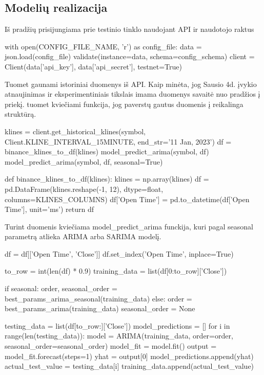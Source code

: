 \documentclass{VUMIFInfKursinis}
\begin{document}
\subsection{Modelių realizacija}

Iš pradžių prisijungiama prie testinio tinklo naudojant API ir naudotojo raktus

\begin{python}
  with open(CONFIG_FILE_NAME, 'r') as config_file:
  	data = json.load(config_file)
  	validate(instance=data, schema=config_schema)
  	client = Client(data['api_key'], data['api_secret'], testnet=True)
\end{python}

Tuomet gaunami istoriniai duomenys iš API. Kaip minėta, jog Sausio 4d. įvykio atnaujinimas ir eksperimentiniais tikslais imama duomenys savaitė nuo pradžios į priekį.
tuomet kviečiami funkcija, jog paverstų gautus duomenis į reikalinga struktūrą.

\begin{python}
  klines = client.get_historical_klines(symbol, Client.KLINE_INTERVAL_15MINUTE, end_str='11 Jan, 2023')
  df = binance_klines_to_df(klines)
  model_predict_arima(symbol, df)
  model_predict_arima(symbol, df, seasonal=True)

  def binance_klines_to_df(klines):
  	klines = np.array(klines)
  	df = pd.DataFrame(klines.reshape(-1, 12), dtype=float, columns=KLINES_COLUMNS)
  	df['Open Time'] = pd.to_datetime(df['Open Time'], unit='ms')
  	return df
\end{python}

Turint duomenis kviečiama model\_predict\_arima funckija, kuri pagal seasonal parametrą atlieka ARIMA arba SARIMA modelį.

\begin{python}
  df = df[['Open Time', 'Close']]
  df.set_index('Open Time', inplace=True)
  
  to_row = int(len(df) * 0.9)
  training_data = list(df[0:to_row]['Close'])
  
  if seasonal:
  	order, seasonal_order = best_params_arima_seasonal(training_data)
  else:
  	order = best_params_arima(training_data)
  	seasonal_order = None
  
  testing_data = list(df[to_row:]['Close'])
  model_predictions = []
  for i in range(len(testing_data)):
  	model = ARIMA(training_data, order=order, seasonal_order=seasonal_order)
  	model_fit = model.fit()
  	output = model_fit.forecast(steps=1)
  	yhat = output[0]
  	model_predictions.append(yhat)
  	actual_test_value = testing_data[i]
  	training_data.append(actual_test_value)
\end{python}
\end{document}

